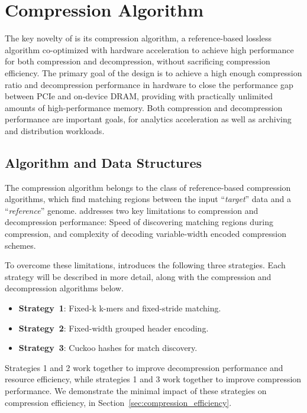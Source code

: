 \section{\name{} Compression Algorithm}
\label{sec:algorithm}

The key novelty of \name{} is its compression algorithm, a reference-based lossless algorithm co-optimized with hardware acceleration to achieve high performance for both compression and decompression, without sacrificing compression efficiency.
The primary goal of the design is to achieve a high enough compression ratio and decompression performance in hardware to close the performance gap between PCIe and on-device DRAM, providing \name{} with practically unlimited amounts of high-performance memory.
Both compression and decompression performance are important goals, for analytics acceleration as well as archiving and distribution workloads.


\subsection{Algorithm and Data Structures}

The \name{} compression algorithm belongs to the class of reference-based compression algorithms, which find matching regions between the input ``\emph{target}'' data and a ``\emph{reference}'' genome.
\name{} addresses two key limitations to compression and decompression performance: Speed of discovering matching regions during compression, and complexity of decoding variable-width encoded compression schemes.

To overcome these limitations, \name{} introduces the following three strategies.
Each strategy will be described in more detail, along with the compression and decompression algorithms below.

\begin{itemize}
    \item \textbf{Strategy~1}: Fixed-k k-mers and fixed-stride matching.
    \item \textbf{Strategy~2}: Fixed-width grouped header encoding.
    \item \textbf{Strategy~3}: Cuckoo hashes for match discovery.
\end{itemize}

Strategies 1 and 2 work together to improve decompression performance and resource efficiency, while strategies 1 and 3 work together to improve compression performance.
We demonstrate the minimal impact of these strategies on compression efficiency, in Section~\ref{sec:compression_efficiency}.


